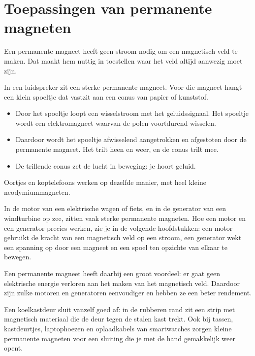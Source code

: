 \documentclass{ximera}
\begin{document}
\section{Toepassingen van permanente magneten}\label{sec:toepassingen-permanente-magneet}
Een permanente magneet heeft geen stroom nodig om een magnetisch veld te maken. Dat maakt hem nuttig in toestellen waar het veld altijd aanwezig moet zijn.

\begin{example}[expandable=true,title={Extra: luidspreker en oortjes}]\nl
    In een luidspreker zit een sterke permanente magneet. Voor die magneet hangt een klein spoeltje dat vastzit aan een conus van papier of kunststof.
    \begin{itemize}
        \item Door het spoeltje loopt een wisselstroom met het geluidssignaal. Het spoeltje wordt een elektromagneet waarvan de polen voortdurend wisselen.
        \item Daardoor wordt het spoeltje afwisselend aangetrokken en afgestoten door de permanente magneet. Het trilt heen en weer, en de conus trilt mee.
        \item De trillende conus zet de lucht in beweging: je hoort geluid.
    \end{itemize}
    Oortjes en koptelefoons werken op dezelfde manier, met heel kleine neodymiummagneten.
\end{example}

\begin{example}[expandable=true,title={Extra: elektromotor en generator}]\nl
    In de motor van een elektrische wagen of fiets, en in de generator van een windturbine op zee, zitten vaak sterke permanente magneten. Hoe een motor en een generator precies werken, zie je in de volgende hoofdstukken: een motor gebruikt de kracht van een magnetisch veld op een stroom, een generator wekt een spanning op door een magneet en een spoel ten opzichte van elkaar te bewegen.

    Een permanente magneet heeft daarbij een groot voordeel: er gaat geen elektrische energie verloren aan het maken van het magnetisch veld. Daardoor zijn zulke motoren en generatoren eenvoudiger en hebben ze een beter rendement.
\end{example}

\begin{example}[expandable=true,title={Extra: magneetsluitingen}]\nl
    Een koelkastdeur sluit vanzelf goed af: in de rubberen rand zit een strip met magnetisch materiaal die de deur tegen de stalen kast trekt. Ook bij tassen, kastdeurtjes, laptophoezen en oplaadkabels van smartwatches zorgen kleine permanente magneten voor een sluiting die je met de hand gemakkelijk weer opent.
\end{example}
\end{document}

